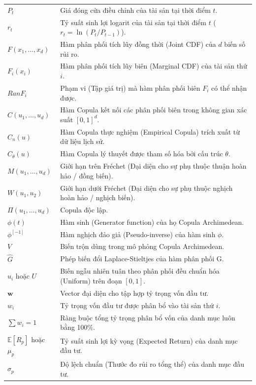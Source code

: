 \documentclass[a4paper,12pt]{article}
\begin{document}
\begin{longtable}{@{} p{2.5cm} p{12.5cm} @{}}
    $P_t$ & Giá đóng cửa điều chỉnh của tài sản tại thời điểm $t$. \\
    $r_t$ & Tỷ suất sinh lợi logarit của tài sản tại thời điểm $t$ ($r_t = \ln(P_t / P_{t-1})$). \\
    $F(x_1, \dots, x_d)$ & Hàm phân phối tích lũy đồng thời (Joint CDF) của $d$ biến số rủi ro. \\
    $F_i(x_i)$ & Hàm phân phối tích lũy biên (Marginal CDF) của tài sản thứ $i$. \\
    $Ran F_i$ & Phạm vi (Tập giá trị) mà hàm phân phối biên $F_i$ có thể nhận được. \\
    $C(u_1, \dots, u_d)$ & Hàm Copula kết nối các phân phối biên trong không gian xác suất $[0,1]^d$. \\
    $C_n(u)$ & Hàm Copula thực nghiệm (Empirical Copula) trích xuất từ dữ liệu lịch sử. \\
    $C_{\theta}(u)$ & Hàm Copula lý thuyết được tham số hóa bởi cấu trúc $\theta$. \\
    $M(u_1, \dots, u_d)$ & Giới hạn trên Fréchet (Đại diện cho sự phụ thuộc thuận hoàn hảo / đồng biến). \\
    $W(u_1, u_2)$ & Giới hạn dưới Fréchet (Đại diện cho sự phụ thuộc nghịch hoàn hảo / nghịch biến). \\
    $\Pi(u_1, \dots, u_d)$ & Copula độc lập. \\
    $\phi(t)$ & Hàm sinh (Generator function) của họ Copula Archimedean. \\
    $\phi^{[-1]}$ & Hàm nghịch đảo giả (Pseudo-inverse) của hàm sinh $\phi$. \\
    $V$ & Biến trộn dùng trong mô phỏng Copula Archimedean. \\
    $\hat{G}$ & Phép biến đổi Laplace-Stieltjes của hàm phân phối G. \\
    $u_i$ hoặc $U$ & Biến ngẫu nhiên tuân theo phân phối đều chuẩn hóa (Uniform) trên đoạn $[0,1]$. \\
    $\mathbf{w}$ & Vector đại diện cho tập hợp tỷ trọng vốn đầu tư. \\
    $w_i$ & Tỷ trọng vốn đầu tư được phân bổ vào tài sản thứ $i$. \\
    $\sum w_i = 1$ & Ràng buộc tổng tỷ trọng phân bổ vốn của danh mục luôn bằng 100\%. \\
    $\mathbb{E}[R_p]$ hoặc $\mu_p$ & Tỷ suất sinh lợi kỳ vọng (Expected Return) của danh mục đầu tư. \\
    $\sigma_p$ & Độ lệch chuẩn (Thước đo rủi ro tổng thể) của danh mục đầu tư. \\

\end{longtable}
\end{document}
